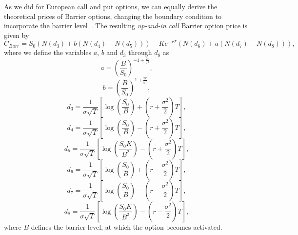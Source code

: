 As we did for European call and put options, we can equally derive the theoretical prices of Barrier options, changing the boundary condition to incorporate the barrier level~\citep{taleb}. The resulting \emph{up-and-in call} Barrier option price is given by
\begin{equation}
C_{Barr}=S_0\left(N(d_3)+b\left(N(d_4)-N(d_5)\right)\right)-Ke^{-rT}\left(N(d_6)+a\left(N(d_7)-N(d_8)\right)\right),
\end{equation}
\noindent where we define the variables $a$, $b$ and $d_3$ through $d_8$ as
\begin{equation}
a=\left(\frac{B}{S_0}\right)^{-1+\frac{2r}{\sigma^2}},
\end{equation}
\begin{equation}
b=\left(\frac{B}{S_0}\right)^{1+\frac{2r}{\sigma^2}},
\end{equation}
\begin{equation}
d_3=\frac{1}{\sigma\sqrt{T}}\left[\log\left(\frac{S_0}{B}\right)+\left(r+\frac{\sigma^2}{2}\right)T\right],
\end{equation}
\begin{equation}
d_4=\frac{1}{\sigma\sqrt{T}}\left[\log\left(\frac{S_0}{B}\right)-\left(r+\frac{\sigma^2}{2}\right)T\right],
\end{equation}
\begin{equation}
d_5=\frac{1}{\sigma\sqrt{T}}\left[\log\left(\frac{S_0K}{B^2}\right)-\left(r+\frac{\sigma^2}{2}\right)T\right],
\end{equation}
\begin{equation}
d_6=\frac{1}{\sigma\sqrt{T}}\left[\log\left(\frac{S_0}{B}\right)+\left(r-\frac{\sigma^2}{2}\right)T\right],
\end{equation}
\begin{equation}
d_7=\frac{1}{\sigma\sqrt{T}}\left[\log\left(\frac{S_0}{B}\right)-\left(r-\frac{\sigma^2}{2}\right)T\right],
\end{equation}
\begin{equation}
d_8=\frac{1}{\sigma\sqrt{T}}\left[\log\left(\frac{S_0K}{B^2}\right)-\left(r-\frac{\sigma^2}{2}\right)T\right],
\end{equation}
\noindent where $B$ defines the barrier level, at which the option becomes activated.